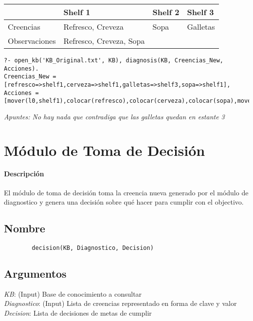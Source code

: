 \documentclass[11pt,fleqn]{article}
\begin{document}
\subsubsection{}
	\begin{tabular}{| l | l | l | l |}
		\hline
						& Shelf 1 & Shelf 2 & Shelf 3 \\ \hline
		Creencias		& Refresco, Creveza & Sopa & Galletas \\ \hline
		Observaciones	& Refresco, Creveza, Sopa & & \\
		\hline
	\end{tabular}
	\begin{lstlisting}
?- open_kb('KB_Original.txt', KB), diagnosis(KB, Creencias_New, Acciones).
Creencias_New = [refresco=>shelf1,cerveza=>shelf1,galletas=>shelf3,sopa=>shelf1],
Acciones = [mover(l0,shelf1),colocar(refresco),colocar(cerveza),colocar(sopa),mover(shelf1,shelf3),colocar(galletas)],
	\end{lstlisting}
	\textit{Apuntes: No hay nada que contradiga que las galletas quedan en estante 3}

\section{Módulo de Toma de Decisión}

\paragraph{Descripción} El módulo de toma de decisión toma la creencia nueva generado por el módulo de diagnostico y genera una decisión sobre qué hacer para cumplir con el objectivo.

\subsection*{Nombre}
	\begin{verbatim}
		decision(KB, Diagnostico, Decision)
	\end{verbatim}

\subsection*{Argumentos}
	\textit{KB}: (Input) Base de conocimiento a consultar \\
	\textit{Diagnostico}: (Input) Lista de creencias representado en forma de clave y valor \\
	\textit{Decision}: Lista de decisiones de metas de cumplir 
\end{document}
